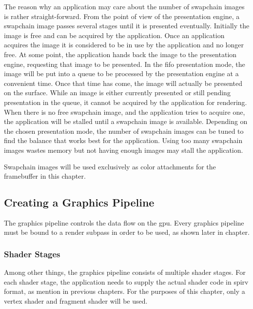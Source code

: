       The reason why an application may care about the number of swapchain images is rather straight-forward.
      From the point of view of the presentation engine, a swapchain image passes several stages until it is presented eventually.
      Initially the image is free and can be acquired by the application.
      Once an application acquires the image it is considered to be in use by the application and no longer free.
      At some point, the application hands back the image to the presentation engine, requesting that image to be presented.
      In the \gls{fifo} presentation mode, the image will be put into a queue to be processed by the presentation engine at a convenient time.
      Once that time has come, the image will actually be presented on the surface.
      While an image is either currently presented or still pending presentation in the queue, it cannot be acquired by the application for rendering.
      When there is no free swapchain image, and the application tries to acquire one, the application will be stalled until a swapchain image is available.
      Depending on the chosen presentation mode, the number of swapchain images can be tuned to find the balance that works best for the application.
      Using too many swapchain images wastes memory but not having enough images may stall the application.

      Swapchain images will be used exclusively as color attachments for the framebuffer in this chapter.

    \subsection{Creating a Graphics Pipeline}
    \label{subsec:GraphicsPipelineSetup}
      The graphics pipeline controls the data flow on the \gls{gpu}.
      Every graphics pipeline must be bound to a render subpass in order to be used, as shown later in chapter.

      \subsubsection{Shader Stages}
      \label{sss:GraphicsPipelineShaderStages}
        Among other things, the graphics pipeline consists of multiple shader stages.
        For each shader stage, the application needs to supply the actual shader code in \gls{spirv} format, as mention in previous chapters.
        For the purposes of this chapter, only a vertex shader and fragment shader will be used.

